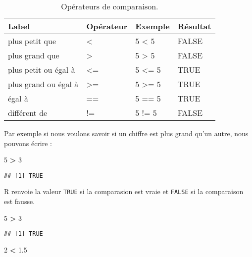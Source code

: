 \documentclass[]{book}
\newenvironment{Shaded}{\begin{snugshade}}{\end{snugshade}}
\newcommand{\DecValTok}[1]{\textcolor[rgb]{0.00,0.00,0.81}{#1}}
\newcommand{\FloatTok}[1]{\textcolor[rgb]{0.00,0.00,0.81}{#1}}
\newcommand{\StringTok}[1]{\textcolor[rgb]{0.31,0.60,0.02}{#1}}
\newcommand{\OperatorTok}[1]{\textcolor[rgb]{0.81,0.36,0.00}{\textbf{#1}}}
\theoremstyle{definition}
\theoremstyle{definition}
\theoremstyle{definition}
\theoremstyle{remark}
\begin{document}
\begin{table}

\caption{\label{tab:tabOpCom}Opérateurs de comparaison.\label{tab:tabOpCom}}
\centering
\begin{tabular}[t]{l|l|l|l}
\hline
Label & Opérateur & Exemple & Résultat\\
\hline
plus petit que & < & 5 < 5 & FALSE\\
\hline
plus grand que & > & 5 > 5 & FALSE\\
\hline
plus petit ou égal à & <= & 5 <= 5 & TRUE\\
\hline
plus grand ou égal à & >= & 5 >= 5 & TRUE\\
\hline
égal à & == & 5 == 5 & TRUE\\
\hline
différent de & != & 5 != 5 & FALSE\\
\hline
\end{tabular}
\end{table}

Par exemple si nous voulons savoir si un chiffre est plus grand qu'un
autre, nous pouvons écrire :

\begin{Shaded}
\begin{Highlighting}[]
\DecValTok{5} \OperatorTok{>}\StringTok{ }\DecValTok{3} 
\end{Highlighting}
\end{Shaded}

\begin{verbatim}
## [1] TRUE
\end{verbatim}

R renvoie la valeur \texttt{TRUE} si la comparasion est vraie et
\texttt{FALSE} si la comparaison est fausse.

\begin{Shaded}
\begin{Highlighting}[]
\DecValTok{5} \OperatorTok{>}\StringTok{ }\DecValTok{3}
\end{Highlighting}
\end{Shaded}

\begin{verbatim}
## [1] TRUE
\end{verbatim}

\begin{Shaded}
\begin{Highlighting}[]
\DecValTok{2} \OperatorTok{<}\StringTok{ }\FloatTok{1.5}
\end{Highlighting}
\end{Shaded}
\end{document}
